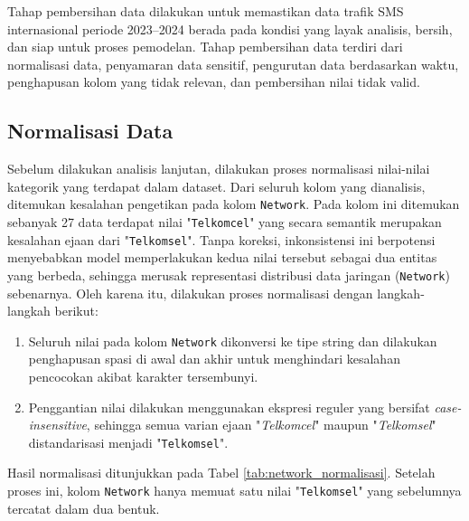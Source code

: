 Tahap pembersihan data dilakukan untuk memastikan data trafik SMS internasional periode 2023--2024 berada pada kondisi yang layak analisis, bersih, dan siap untuk proses pemodelan. Tahap pembersihan data terdiri dari normalisasi data, penyamaran data sensitif, pengurutan data berdasarkan waktu, penghapusan kolom yang tidak relevan, dan pembersihan nilai tidak valid.


\subsection{Normalisasi Data}
\label{subsubsec:normalisasi}

Sebelum dilakukan analisis lanjutan, dilakukan proses normalisasi nilai-nilai kategorik yang terdapat dalam dataset. Dari seluruh kolom yang dianalisis, ditemukan kesalahan pengetikan pada kolom \texttt{Network}. Pada kolom ini ditemukan sebanyak 27 data terdapat nilai "\texttt{Telkomcel}" yang secara semantik merupakan kesalahan ejaan dari "\texttt{Telkomsel}". Tanpa koreksi, inkonsistensi ini berpotensi menyebabkan model memperlakukan kedua nilai tersebut sebagai dua entitas yang berbeda, sehingga merusak representasi distribusi data jaringan (\texttt{Network}) sebenarnya. Oleh karena itu, dilakukan proses normalisasi dengan langkah-langkah berikut:

\begin{enumerate}
    \item Seluruh nilai pada kolom \texttt{Network} dikonversi ke tipe string dan dilakukan penghapusan spasi di awal dan akhir  untuk menghindari kesalahan pencocokan akibat karakter tersembunyi.
    \item Penggantian nilai dilakukan menggunakan ekspresi reguler yang bersifat \textit{case-insensitive}, sehingga semua varian ejaan "\textit{Telkomcel}" maupun "\textit{Telkomsel}" distandarisasi menjadi "\texttt{Telkomsel}".
\end{enumerate}

Hasil normalisasi ditunjukkan pada Tabel \ref{tab:network_normalisasi}. Setelah proses ini, kolom \texttt{Network} hanya memuat satu nilai "\texttt{Telkomsel}" yang sebelumnya tercatat dalam dua bentuk.

